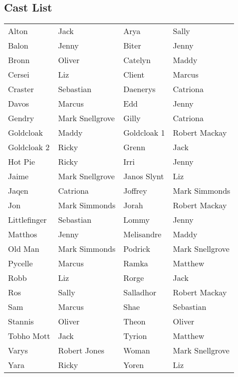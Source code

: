 \subsection*{Cast List}
\begin{tabular}{ll|ll}\\
Alton & Jack &  Arya & Sally\\
Balon & Jenny &  Biter & Jenny\\
Bronn & Oliver &  Catelyn & Maddy\\
Cersei & Liz &  Client & Marcus\\
Craster & Sebastian &  Daenerys & Catriona\\
Davos & Marcus &  Edd & Jenny\\
Gendry & Mark Snellgrove &  Gilly & Catriona\\
Goldcloak & Maddy &  Goldcloak 1 & Robert Mackay\\
Goldcloak 2 & Ricky &  Grenn & Jack\\
Hot Pie & Ricky &  Irri & Jenny\\
Jaime & Mark Snellgrove &  Janos Slynt & Liz\\
Jaqen & Catriona &  Joffrey & Mark Simmonds\\
Jon & Mark Simmonds &  Jorah & Robert Mackay\\
Littlefinger & Sebastian &  Lommy & Jenny\\
Matthos & Jenny &  Melisandre & Maddy\\
Old Man & Mark Simmonds &  Podrick & Mark Snellgrove\\
Pycelle & Marcus &  Ramka & Matthew\\
Robb & Liz &  Rorge & Jack\\
Ros & Sally &  Salladhor & Robert Mackay\\
Sam & Marcus &  Shae & Sebastian\\
Stannis & Oliver &  Theon & Oliver\\
Tobho Mott & Jack &  Tyrion & Matthew\\
Varys & Robert Jones &  Woman & Mark Snellgrove\\
Yara & Ricky &  Yoren & Liz\\
\end{tabular}
